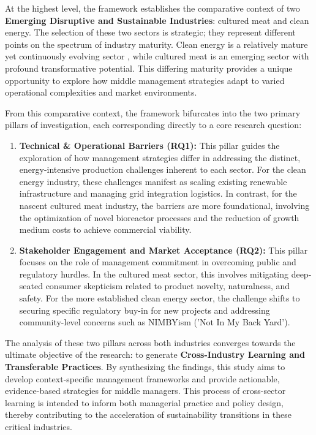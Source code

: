 At the highest level, the framework establishes the comparative context of two \textbf{Emerging Disruptive and Sustainable Industries}: cultured meat and clean energy. The selection of these two sectors is strategic; they represent different points on the spectrum of industry maturity. Clean energy is a relatively mature yet continuously evolving sector , while cultured meat is an emerging sector with profound transformative potential. This differing maturity provides a unique opportunity to explore how middle management strategies adapt to varied operational complexities and market environments.

From this comparative context, the framework bifurcates into the two primary pillars of investigation, each corresponding directly to a core research question:

\begin{enumerate}
	\item \textbf{Technical \& Operational Barriers (RQ1):} This pillar guides the exploration of how management strategies differ in addressing the distinct, energy-intensive production challenges inherent to each sector. For the clean energy industry, these challenges manifest as scaling existing renewable infrastructure and managing grid integration logistics. In contrast, for the nascent cultured meat industry, the barriers are more foundational, involving the optimization of novel bioreactor processes and the reduction of growth medium costs to achieve commercial viability.
	
	\item \textbf{Stakeholder Engagement and Market Acceptance (RQ2):} This pillar focuses on the role of management commitment in overcoming public and regulatory hurdles. In the cultured meat sector, this involves mitigating deep-seated consumer skepticism related to product novelty, naturalness, and safety. For the more established clean energy sector, the challenge shifts to securing specific regulatory buy-in for new projects and addressing community-level concerns such as NIMBYism ('Not In My Back Yard').
\end{enumerate}

The analysis of these two pillars across both industries converges towards the ultimate objective of the research: to generate \textbf{Cross-Industry Learning and Transferable Practices}. By synthesizing the findings, this study aims to develop context-specific management frameworks and provide actionable, evidence-based strategies for middle managers. This process of cross-sector learning is intended to inform both managerial practice and policy design, thereby contributing to the acceleration of sustainability transitions in these critical industries.

